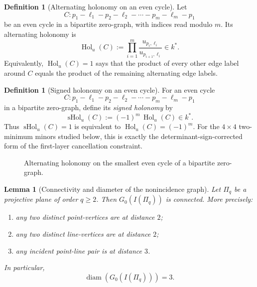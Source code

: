 \documentclass[11pt]{amsart}
\numberwithin{equation}{section}
\theoremstyle{plain}
\newtheorem{lemma}[theorem]{Lemma}
\theoremstyle{definition}
\newtheorem{definition}[theorem]{Definition}
\theoremstyle{remark}
\begin{document}
\begin{definition}[Alternating holonomy on an even cycle]
Let
\[
C: p_1-\ell_1-p_2-\ell_2-\cdots-p_m-\ell_m-p_1
\]
be an even cycle in a bipartite zero-graph, with indices read modulo $m$. Its alternating holonomy is
\[
\operatorname{Hol}_{u}(C):=\prod_{i=1}^m \frac{u_{p_i,\ell_i}}{u_{p_{i+1},\ell_i}}\in k^*.
\]
Equivalently, $\operatorname{Hol}_{u}(C)=1$ says that the product of every other edge label around $C$ equals the product of the
remaining alternating edge labels.
\end{definition}

\begin{definition}[Signed holonomy on an even cycle]
\label{def:signed-holonomy}
For an even cycle
\[
C: p_1-\ell_1-p_2-\ell_2-\cdots-p_m-\ell_m-p_1
\]
in a bipartite zero-graph, define its \emph{signed holonomy} by
\[
\operatorname{sHol}_{u}(C):=(-1)^m\,\operatorname{Hol}_{u}(C)\in k^*.
\]
Thus $\operatorname{sHol}_{u}(C)=1$ is equivalent to $\operatorname{Hol}_{u}(C)=(-1)^m$.
For the $4\times4$ two-minimum minors studied below, this is exactly the determinant-sign-corrected form of the first-layer
cancellation constraint.
\end{definition}

\begin{figure}[htbp]
\centering
{}
\caption{Alternating holonomy on the smallest even cycle of a bipartite zero-graph.}
\label{fig:holonomy-cycle}
\end{figure}

\begin{lemma}[Connectivity and diameter of the nonincidence graph]
\label{lem:g0-connected}
Let $\Pi_q$ be a projective plane of order $q\ge 2$. Then $G_0(I(\Pi_q))$ is connected. More precisely:
\begin{enumerate}[leftmargin=2em]
  \item any two distinct point-vertices are at distance $2$;
  \item any two distinct line-vertices are at distance $2$;
  \item any incident point-line pair is at distance $3$.
\end{enumerate}
In particular,
\[
\operatorname{diam}(G_0(I(\Pi_q)))=3.
\]
\end{lemma}
\end{document}
